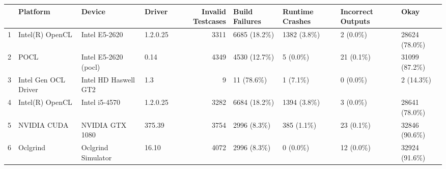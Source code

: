 \begin{tabular}{llllrllll}
\toprule
{} &              Platform &                Device &    Driver &  Invalid Testcases & Build Failures & Runtime Crashes & Incorrect Outputs &            Okay \\
\midrule
1 &       Intel(R) OpenCL &         Intel E5-2620 &  1.2.0.25 &               3311 &  6685  (18.2\%) &    1382  (3.8\%) &         2  (0.0\%) &  28624  (78.0\%) \\
2 &                  POCL &  Intel E5-2620 (pocl) &      0.14 &               4349 &  4530  (12.7\%) &       5  (0.0\%) &        21  (0.1\%) &  31099  (87.2\%) \\
3 &  Intel Gen OCL Driver &  Intel HD Haswell GT2 &       1.3 &                  9 &    11  (78.6\%) &       1  (7.1\%) &         0  (0.0\%) &      2  (14.3\%) \\
4 &       Intel(R) OpenCL &         Intel i5-4570 &  1.2.0.25 &               3282 &  6684  (18.2\%) &    1394  (3.8\%) &         3  (0.0\%) &  28641  (78.0\%) \\
5 &           NVIDIA CUDA &       NVIDIA GTX 1080 &    375.39 &               3754 &   2996  (8.3\%) &     385  (1.1\%) &        23  (0.1\%) &  32846  (90.6\%) \\
6 &              Oclgrind &    Oclgrind Simulator &     16.10 &               4072 &   2996  (8.3\%) &       0  (0.0\%) &        12  (0.0\%) &  32924  (91.6\%) \\
\bottomrule
\end{tabular}
